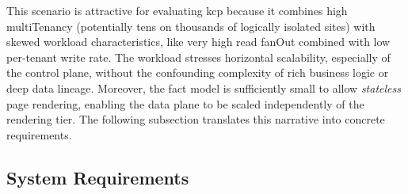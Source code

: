 \documentclass[11pt, a4paper, oneside, listof=totoc]{scrartcl}
\begin{document}
            This scenario is attractive for evaluating \gls{kcp} because it combines high
            \gls{multiTenancy} (potentially tens on thousands of logically isolated sites) with
            skewed workload characteristics, like very high read \gls{fanOut} combined with low
            per-tenant write rate.
            The workload stresses horizontal scalability, especially of the control plane, without
            the confounding complexity of rich business logic or deep data lineage.
            Moreover, the fact model is sufficiently small to allow \textit{stateless} page
            rendering, enabling the data plane to be scaled independently of the rendering tier.
            The following subsection translates this narrative into concrete requirements.
            

        \subsection{System Requirements}\label{subsec:requirements}
\end{document}
